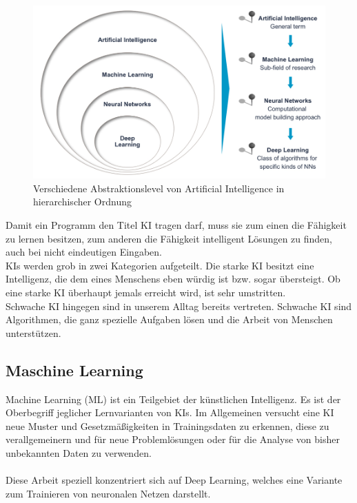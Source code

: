 \documentclass[12pt,oneside,a4paper,parskip]{scrbook}
\begin{document}
\begin{figure}[ht]
	\begin{center}
		\includegraphics[width=14cm]{Bilder/Abstraktionslevel_von_AI.jpg}
		\caption{Verschiedene Abstraktionslevel von Artificial Intelligence in hierarchischer Ordnung}
		\label{fig:Uebersicht}
	\end{center}
\end{figure}
Damit ein Programm den Titel KI tragen darf, muss sie zum einen die Fähigkeit zu lernen besitzen, zum anderen die Fähigkeit intelligent Lösungen zu finden, auch bei nicht eindeutigen Eingaben.\\
KIs werden grob in zwei Kategorien aufgeteilt.
Die starke KI besitzt eine Intelligenz, die dem eines Menschens eben würdig ist bzw. sogar übersteigt. Ob eine starke KI überhaupt jemals erreicht wird, ist sehr umstritten. \\Schwache KI hingegen sind in unserem Alltag bereits vertreten. Schwache KI sind Algorithmen, die ganz spezielle Aufgaben lösen und die Arbeit von Menschen unterstützen.
\subsection{Maschine Learning}
Machine Learning (ML) ist ein Teilgebiet der künstlichen Intelligenz. Es ist der Oberbegriff jeglicher Lernvarianten von KIs. Im Allgemeinen versucht eine KI neue Muster und Gesetzmäßigkeiten in Trainingsdaten zu erkennen, diese zu verallgemeinern und für neue Problemlösungen oder für die Analyse von bisher unbekannten Daten zu verwenden\cite{EliminateHumanBias}.
\\\\Diese Arbeit speziell konzentriert sich auf Deep Learning, welches eine Variante zum Trainieren von neuronalen Netzen darstellt.
\end{document}
